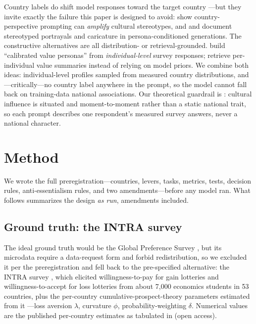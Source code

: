 \documentclass[10pt,letterpaper]{article}
\begin{document}
Country labels do shift model responses toward the target country
\citep{durmus2023,tao2024}---but they invite exactly the failure this paper
is designed to avoid: \citet{durmus2023} show country-perspective prompting
can \textit{amplify} cultural stereotypes, and \citet{cheng2023a} and
\citet{cheng2023b} document stereotyped portrayals and caricature in
persona-conditioned generations. The constructive alternatives are all
distribution- or retrieval-grounded. \citet{abels2026} build ``calibrated
value personas'' from \textit{individual-level} survey responses;
\citet{seo2025} retrieve per-individual value summaries instead of relying
on model priors. We combine both ideas: individual-level profiles sampled
from measured country distributions, and---critically---no country label
anywhere in the prompt, so the model cannot fall back on training-data
national associations. Our theoretical guardrail is \citet{oyserman2008}:
cultural influence is situated and moment-to-moment rather than a static
national trait, so each prompt describes one respondent's measured survey
answers, never a national character.

\section{Method}

We wrote the full preregistration---countries, levers, tasks, metrics,
tests, decision rules, anti-essentialism rules, and two amendments---before
any model ran. What follows summarizes the design \textit{as run},
amendments included.

\subsection{Ground truth: the INTRA survey}

The ideal ground truth would be the Global Preference Survey
\citep{falk2018}, but its microdata require a data-request form and forbid
redistribution, so we excluded it per the preregistration and fell back to
the pre-specified alternative: the INTRA survey \citep{rieger2015}, which
elicited willingness-to-pay for gain lotteries and willingness-to-accept for
loss lotteries from about 7,000 economics students in 53 countries, plus
the per-country cumulative-prospect-theory parameters estimated from it
\citep{rieger2017}---loss aversion $\lambda$, curvature $\phi$,
probability-weighting $\delta$. Numerical values are the published
per-country estimates as tabulated in \citet{xie2018} (open access).
\end{document}
